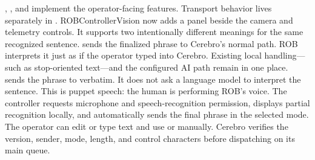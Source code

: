 \markdownRendererInterblockSeparator
{}\markdownRendererBlockQuoteBegin
{} , , and  implement the operator-facing features. Transport behavior lives separately in .\markdownRendererBlockQuoteEnd \markdownRendererInterblockSeparator
{}ROBControllerVision now adds a  panel beside the\markdownRendererSoftLineBreak
{}camera and telemetry controls. It supports two intentionally different\markdownRendererSoftLineBreak
{}meanings for the same recognized sentence.\markdownRendererParagraphSeparator
{} sends the finalized phrase to Cerebro's normal  path.\markdownRendererSoftLineBreak
{}ROB interprets it just as if the operator typed into Cerebro. Existing local\markdownRendererSoftLineBreak
{}handling—such as stop-oriented text—and the configured AI path remain in one\markdownRendererSoftLineBreak
{}place.\markdownRendererParagraphSeparator
{} sends the phrase to  verbatim. It does not ask a\markdownRendererSoftLineBreak
{}language model to interpret the sentence. This is puppet speech: the human is\markdownRendererSoftLineBreak
{}performing ROB's voice.\markdownRendererInterblockSeparator
{}\markdownRendererInterblockSeparator
{}The controller requests microphone and speech-recognition permission, displays\markdownRendererSoftLineBreak
{}partial recognition locally, and automatically sends the final phrase in the\markdownRendererSoftLineBreak
{}selected mode. The operator can edit or type text and use  or\markdownRendererSoftLineBreak
{} manually. Cerebro verifies the version, sender, mode, length,\markdownRendererSoftLineBreak
{}and control characters before dispatching on its main queue.\markdownRendererInterblockSeparator
